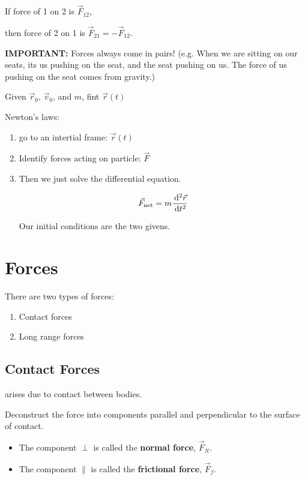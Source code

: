 If force of 1 on 2 is $\vec F_{12}$,

then force of 2 on 1 is $\vec F_{21} = - \vec F_{12}$.

\textbf{IMPORTANT:} Forces always come in pairs! (e.g. When we are sitting on our seats, its us pushing on the seat, and the seat pushing on us. The force of us pushing on the seat comes from gravity.)

\begin{example}
	Given $\vec r_0$, $\vec v_0$, and $m$, fint $\vec r(t)$

	Newton's laws:

	\begin{enumerate}
		\item go to an intertial frame: $\vec r(t)$
		\item Identify forces acting on particle: $\vec F$
		\item Then we just solve the differential equation.
		
		\begin{equation}
			\vec F_\mathrm{net} = m\frac{\D^2 \vec r}{\D t^2}
		\end{equation}

		Our initial conditions are the two givens.
	\end{enumerate}
\end{example}

\section{Forces}

There are two types of forces:

\begin{enumerate}
	\item Contact forces
	\item Long range forces
\end{enumerate}

\subsection{Contact Forces}
arises due to contact between bodies.

Deconstruct the force into components parallel and perpendicular to the surface of contact.

\begin{itemize}
	\item The component $\perp$ is called the \textbf{normal force}, $\vec F_N$.
	\item The component $\parallel$ is called the \textbf{frictional force}, $\vec F_f$.
\end{itemize}

